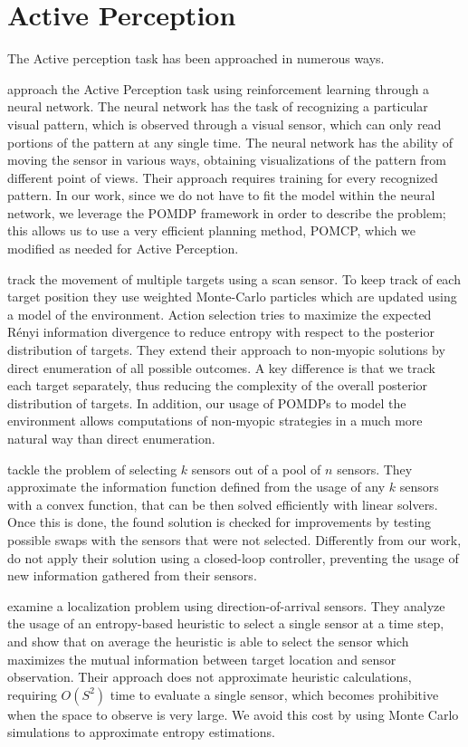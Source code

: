 \section{Active Perception}

The Active perception task has been approached in numerous ways.

\citet{cit:relworkneuralnet} approach the Active Perception task using reinforcement learning through
a neural network. The neural network has the task of recognizing a particular visual pattern, which
is observed through a visual sensor, which can only read portions of the pattern at any single time.
The neural network has the ability of moving the sensor in various ways, obtaining visualizations of
the pattern from different point of views. Their approach requires training for every recognized
pattern. In our work, since we do not have to fit the model within the neural network, we leverage
the POMDP framework in order to describe the problem; this allows us to use a very efficient
planning method, POMCP, which we modified as needed for Active Perception.

\citet{cit:relworktanks} track the movement of multiple targets using a scan sensor. To keep track
of each target position they use weighted Monte-Carlo particles which are updated using a model of
the environment. Action selection tries to maximize the expected Rényi information divergence to
reduce entropy with respect to the posterior distribution of targets. They extend their approach to
non-myopic solutions by direct enumeration of all possible outcomes. A key difference is that we
track each target separately, thus reducing the complexity of the overall posterior distribution of
targets. In addition, our usage of POMDPs to model the environment allows computations of non-myopic
strategies in a much more natural way than direct enumeration.

\citet{cit:relworkconvex} tackle the problem of selecting $k$ sensors out of a pool of $n$ sensors.
They approximate the information function defined from the usage of any $k$ sensors with a convex
function, that can be then solved efficiently with linear solvers. Once this is done, the found
solution is checked for improvements by testing possible swaps with the sensors that were not selected.
Differently from our work, \citet{cit:relworkconvex} do not apply their solution using a closed-loop
controller, preventing the usage of new information gathered from their sensors.

\citet{cit:relworkentropy} examine a localization problem using direction-of-arrival sensors. They
analyze the usage of an entropy-based heuristic to select a single sensor at a time step, and show
that on average the heuristic is able to select the sensor which maximizes the mutual information
between target location and sensor observation. Their approach does not approximate heuristic
calculations, requiring $O(S^2)$ time to evaluate a single sensor, which becomes prohibitive when
the space to observe is very large. We avoid this cost by using Monte Carlo simulations to
approximate entropy estimations.

